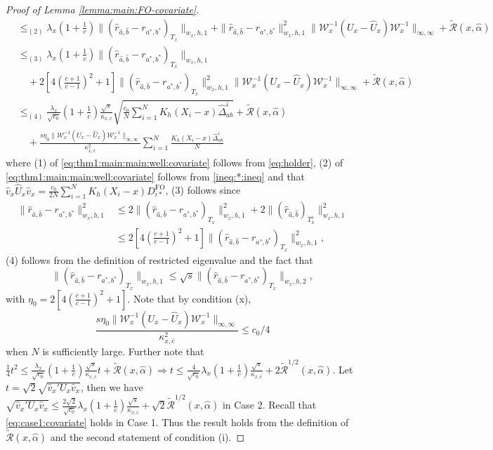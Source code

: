 \documentclass[11pt]{article}
\begin{document}
\begin{proof}[Proof of Lemma \ref{lemma:main:FO-covariate}]
\begin{equation}
\begin{array}{rl}
&\displaystyle \leq_{(2)} \lambda_x(1+\frac{1}{c})\|(\hat r_{\hat a,\hat b} - r_{a^*,b^*})_{T_x}\|_{w_x,h,1} + \|\hat r_{\hat a,\hat b} - r_{a^*,b^*}\|_{w_x,h,1}^2\! \|\mathcal{W}_x^{-1}(U_x-\hat U_x)\mathcal{W}_x^{-1}\|_{\infty,\infty}+ \widetilde{\mathcal{R}}(x,\hat\alpha)\\
&\displaystyle\leq_{(3)}\lambda_x(1+\frac{1}{c})\|(\hat r_{\hat a,\hat b} - r_{a^*,b^*})_{T_x}\|_{w_x,h,1}\\
&\displaystyle\quad+2\left[4(\frac{c+1}{c-1})^2+1\right]\!\!\|(\hat{r}_{\hat{a},\hat{b}}-r_{a^*,b^*})_{T_x}\|_{w_x,h,1}^2\|\mathcal{W}_x^{-1}(U_x-\hat U_x)\mathcal{W}_x^{-1}\|_{\infty,\infty}+ \widetilde{\mathcal{R}}(x,\hat\alpha)\\
&\displaystyle\leq_{(4)}\frac{\lambda_x}{\sqrt{c_0}}\left(1+\frac{1}{c}\right) \frac{\sqrt{s}}{\kappa_{x,\bar{c}}}\sqrt{\frac{c_0}{N} \sum_{i=1}^NK_h(X_i-x)\hat{\Delta}_{ab}^i} + \widetilde{\mathcal{R}}(x,\hat\alpha)\\
&\displaystyle\quad+\frac{s\eta_0\|\!\mathcal{W}_x^{-1}\!(U_x-\hat U_x)\!\mathcal{W}_x^{-1}\|_{\infty,\infty}}{\kappa_{x,\bar{c}}^2}\sum_{i=1}^N\frac{K_h(X_i-x)\hat{\Delta}_{ab}^i}{N}
\end{array}
\end{equation}
where (1) of \eqref{eq:thm1:main:main:well:covariate} follows from \eqref{eq:holder}, (2) of \eqref{eq:thm1:main:main:well:covariate} follows from \eqref{ineq:*:ineq} and that $\hat{v}_x\hat{U}_x\hat{v}_x=\frac{c_0}{2N} \sum_{i=1}^NK_h(X_i-x)D_{i*}^{\mathrm{FO}}$, (3) follows since 
$$\begin{array}{rl}
\|\hat{r}_{\hat{a},\hat{b}}-r_{a^*,b^*}\|_{w_x,h,1}^2&\displaystyle\leq2\|(\hat{r}_{\hat{a},\hat{b}}-r_{a^*,b^*})_{T_x}\|_{w_x,h,1}^2+2\|(\hat{r}_{\hat{a},\hat{b}})_{T_x^c}\|_{w_x,h,1}^2\\
&\displaystyle\leq2\left[4(\frac{c+1}{c-1})^2+1\right]\|(\hat{r}_{\hat{a},\hat{b}}-r_{a^*,b^*})_{T_x}\|_{w_x,h,1}^2,
\end{array}$$
(4) follows from the definition of restricted eigenvalue and the fact that 
$$\|(\hat{r}_{\hat{a},\hat{b}}-r_{a^*,b^*})_{T_x}\|_{w_x,h,1}\leq\sqrt{s}\|(\hat{r}_{\hat{a},\hat{b}}-r_{a^*,b^*})_{T_x}\|_{w_x,h,2},$$ 
with $\eta_0=2\left[4\left(\frac{c+1}{c-1}\right)^2+1\right]$.
Note that by condition (x), $$\frac{s\eta_0\|\mathcal{W}_x^{-1}(U_x-\hat U_x)\mathcal{W}_x^{-1}\|_{\infty,\infty}}{\kappa_{x,\bar{c}}^2} \leq c_0/4$$ 
when $N$ is sufficiently large. Further note that $\frac{1}{4}t^2 \leq \frac{\lambda_x}{\sqrt{c_0}}(1+\frac{1}{c})\frac{\sqrt{s}}{\kappa_{x,\bar{c}}} t + \mathcal{\widetilde{R}}(x,\hat \alpha) \Rightarrow t \leq\frac{4}{\sqrt{c_0}}\lambda_x(1+\frac{1}{c})\frac{\sqrt{s}}{\kappa_{x,\bar{c}}} + 2{\mathcal{\widetilde{R}}}^{1/2}(x,\hat \alpha)$. Let $t=\sqrt{2}\sqrt{\hat{v}_x'U_x\hat{v}_x}$, then we have $\sqrt{\hat{v}_x'U_x\hat{v}_x}\leq\frac{2\sqrt{2}}{\sqrt{c_0}}\lambda_x(1+\frac{1}{c})\frac{\sqrt{s}}{\kappa_{x,\bar{c}}} + \sqrt{2}{\mathcal{\widetilde{R}}}^{1/2}(x,\hat \alpha)$ in Case 2. Recall that \eqref{eq:case1:covariate} holds in Case 1. Thus the result holds from the definition of $\widetilde{\mathcal{R}}(x,\hat{\alpha})$ and the second statement of condition (i). 

\end{proof}
\end{document}

